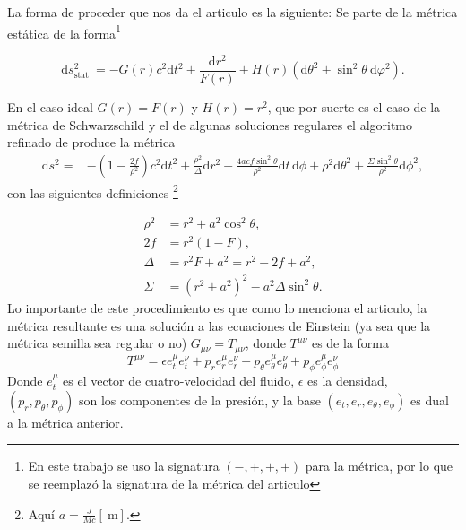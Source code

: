La forma de proceder que nos da el articulo es la siguiente:
Se parte de la métrica estática de la forma\footnote{En este trabajo se uso la signatura $(-,+,+,+)$ para la métrica, por lo que se reemplazó la signatura de la métrica del articulo }

\begin{equation}
    \mathrm{d} s_{\text {stat }}^2 = - G(r) c^2 \mathrm{d} t^2+\frac{\mathrm{d} r^2}{F(r)}+H(r)\left(\mathrm{d} \theta^2+\sin ^2 \theta \mathrm{~d} \varphi^2\right).
\end{equation}

En el caso ideal $G(r)=F(r)$ y $H(r)=r^2$, que por suerte es el caso de la métrica de Schwarzschild y el de algunas soluciones regulares  el  algoritmo refinado de \cite{azreg-ainou-2014} produce la métrica
\begin{align}
    \mathrm{d}s^2 = &
    - \left(1 - \frac{2f}{\rho^2}\right) c^2 \mathrm{d}t^2
    + \frac{\rho^2}{\Delta} \mathrm{d}r^2
    - \frac{4acf \sin^2\theta}{\rho^2} \mathrm{d}t\, \mathrm{d}\phi
    + \rho^2 \mathrm{d}\theta^2
    + \frac{\Sigma \sin^2\theta}{\rho^2} \mathrm{d}\phi^2,
    \label{eq:metricGeneratedByNewmanJanis}
\end{align}
con las siguientes definiciones \footnote{Aquí  $a=\frac{J}{M c} [\mathrm{~m}]$.}

\begin{align}
    \rho^2 & =r^2+a^2 \cos ^2 \theta,                            \\
    2 f    & =r^2(1-F),                                          \\
    \Delta & =r^2 F+a^2=r^2-2 f+a^2,                             \\
    \Sigma & =\left(r^2+a^2\right)^2-a^2 \Delta \sin ^2 \theta .
\end{align}
Lo importante de este procedimiento es que como lo menciona el articulo, la métrica resultante es una solución a las ecuaciones de Einstein (ya sea que la métrica semilla sea regular o no) $G_{\mu \nu}=T_{\mu \nu}$, donde $T^{\mu \nu}$ es de la forma
\begin{equation}
    T^{\mu \nu}=\epsilon e_t^\mu e_t^\nu+p_r e_r^\mu e_r^\nu+p_\theta e_\theta^\mu e_\theta^\nu+p_\phi e_\phi^\mu e_\phi^\nu
\end{equation}
Donde $e_t^\mu$ es el vector de cuatro-velocidad del fluido, $\epsilon$ es la densidad, $\left(p_r, p_\theta, p_\phi\right)$ son los componentes de la presión, y la base $\left(e_t, e_r, e_\theta, e_\phi\right)$ es dual a la métrica anterior.

